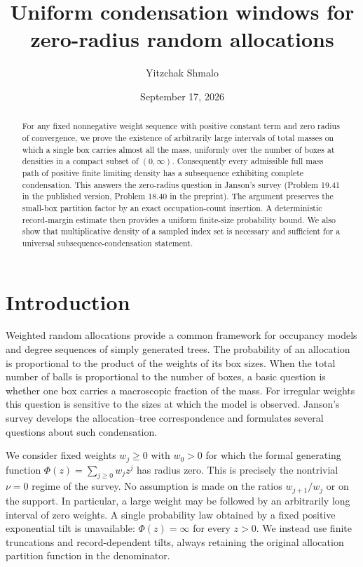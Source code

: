 \documentclass[11pt]{amsart}
\title[Uniform condensation windows]{Uniform condensation windows for zero-radius random allocations}
\author{Yitzchak Shmalo}
\date{September 17, 2026}
\theoremstyle{remark}\newtheorem{remark}[theorem]{Remark}
\begin{document}
\begin{abstract}
For any fixed nonnegative weight sequence with positive constant term and
zero radius of convergence, we prove the existence of arbitrarily large
intervals of total masses on which a single box carries almost all the mass,
uniformly over the number of boxes at densities in a compact subset of
$(0,\infty)$. Consequently every admissible full mass path of positive finite
limiting density has a subsequence exhibiting complete condensation. This
answers the zero-radius question in Janson's survey (Problem 19.41 in the
published version, Problem 18.40 in the preprint).
The argument preserves the small-box partition factor by an exact
occupation-count insertion. A deterministic record-margin estimate then
provides a uniform finite-size probability bound. We also show that
multiplicative density of a sampled index set is necessary and sufficient
for a universal subsequence-condensation statement.
\end{abstract}

\maketitle

\section{Introduction}\label{sec:intro}
Weighted random allocations provide a common framework for occupancy models
and degree sequences of simply generated trees. The probability of an
allocation is proportional to the product of the weights of its box sizes.
When the total number of balls is proportional to the number of boxes, a
basic question is whether one box carries a macroscopic fraction of the
mass. For irregular weights this question is sensitive to the sizes at
which the model is observed. Janson's survey \cite{Janson} develops the
allocation--tree correspondence and formulates several questions about
such condensation.

We consider fixed weights $w_j\ge0$ with $w_0>0$ for which the formal
generating function $\Phi(z)=\sum_{j\ge0}w_jz^j$ has radius zero. This is
precisely the nontrivial $\nu=0$ regime of the survey. No assumption is made
on the ratios $w_{j+1}/w_j$ or on the support. In particular, a large weight
may be followed by an arbitrarily long interval of zero weights. A single
probability law obtained by a fixed positive exponential tilt is unavailable:
$\Phi(z)=\infty$ for every $z>0$. We instead use finite truncations and
record-dependent tilts, always retaining the original allocation
partition function in the denominator.
\end{document}
